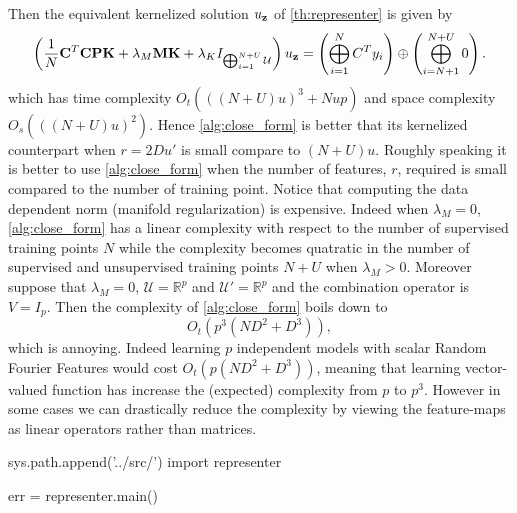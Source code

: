 Then the equivalent kernelized solution $u_{\boldsymbol{\mathbf{z}}}$ of \cref{th:representer} is given by \cite{minh2016unifying}
\begin{dmath*}
\left(\frac{1}{N}\mathbf{C}^T \mathbf{C} \mathbf{P} \mathbf{K} + \lambda_M \mathbf{M} \mathbf{K} + \lambda_K I_{\Vect_{i=1}^{N+U}\mathcal{U}}\right)u_{\seq{z}}=\left(\Vect_{i=1}^N C^T y_i\right) \oplus \left(\Vect_{i=N+1}^{N+U} 0 \right).
\end{dmath*}
which has time complexity $O_t(((N+U)u)^3+ Nup)$ and space complexity $O_s(((N+U)u)^2)$. Hence \cref{alg:close_form} is better that its kernelized counterpart when $r=2Du'$ is small compare to $(N+U)u$. Roughly speaking it is better to use \cref{alg:close_form} when the number of features, $r$, required is small compared to the number of training point. Notice that computing the data dependent norm (manifold regularization) is expensive. Indeed when $\lambda_M=0$, \cref{alg:close_form} has a linear complexity with respect to the number of supervised training points $N$ while the complexity becomes quatratic in the number of supervised and unsupervised training points $N+U$ when $\lambda_M>0$. Moreover suppose that $\lambda_M=0$, $\mathcal{U}=\mathbb{R}^p$ and $\mathcal{U}'=\mathbb{R}^{p}$ and the combination operator is $V=I_{p}$. Then the complexity of \cref{alg:close_form} boils down to
\begin{dmath*}
O_t(p^3(ND^2+D^3)),
\end{dmath*}
which is annoying. Indeed learning $p$ independent models with scalar Random Fourier Features would cost $O_t(p(ND^2+D^3))$, meaning that learning vector-valued function has increase the (expected) complexity from $p$ to $p^3$. However in some cases we can drastically reduce the complexity by viewing the feature-maps as linear operators rather than matrices.

\begin{pycode}[representer]
sys.path.append('../src/')
import representer

err = representer.main()
\end{pycode}


